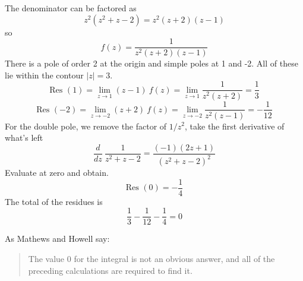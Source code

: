 \documentclass[11pt, oneside]{article}
\begin{document}
The denominator can be factored as
\[ z^2(z^2 + z - 2) = z^2(z + 2)(z - 1) \]
so
\[ f(z) = \frac{1}{z^2(z + 2)(z - 1)} \]
There is a pole of order 2 at the origin and simple poles at 1 and -2.  All of these lie within the contour $|z| = 3$.
\[ \text{Res }(1) = \lim_{z \rightarrow 1} (z-1) \ f(z) = \lim_{z \rightarrow 1} \frac{1}{z^2 (z + 2)} = \frac{1}{3} \]
\[ \text{Res }(-2) = \lim_{z \rightarrow -2} (z+2) \ f(z) = \lim_{z \rightarrow -2} \frac{1}{z^2 (z - 1)} = -\frac{1}{12} \]
For the double pole, we remove the factor of $1/z^2$, take the first derivative of what's left
\[ \frac{d}{dz} \ \frac{1}{z^2 + z - 2} = \frac{(-1)(2z + 1)}{(z^2 + z - 2)^2} \]
Evaluate at zero and obtain.
\[ \text{Res }(0) = - \frac{1}{4} \]
The total of the residues is
\[ \frac{1}{3} -\frac{1}{12} - \frac{1}{4} = 0 \]

As Mathews and Howell say:
\begin{quote}The value 0 for the integral is not an obvious answer, and all of the preceding calculations are required to find it.\end{quote}
\end{document}
